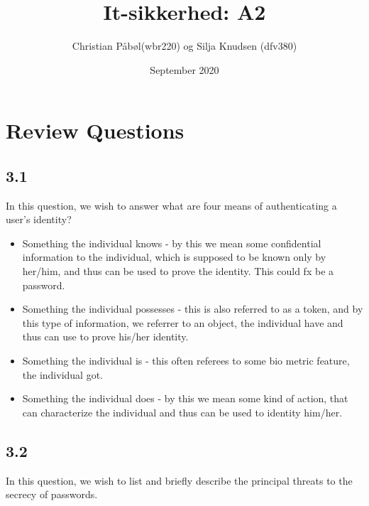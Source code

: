 \documentclass{article}
\title{It-sikkerhed: A2}
\author{Christian Påbøl(wbr220) og Silja Knudsen (dfv380) }
\date{September 2020}
\begin{document}
\maketitle

\section{Review Questions}
\subsection{3.1}
In this question, we wish to answer what are four means of authenticating a user’s identity?\\ 

\begin{itemize}
    \item Something the individual knows -  by this we mean some confidential information to the individual, which is supposed to be known only by her/him, and thus can be used to prove the identity. This could fx be a password. 
    
    \item Something the individual possesses - this is also referred to as a token, and by this type of information, we referrer to an object, the individual have and thus can use to prove his/her identity. 
    
    \item Something the individual is - this often referees to some bio metric feature, the individual got. 
    
    \item Something the individual does - by this we mean some kind of action, that can characterize the individual and thus can be used to identity him/her. 
\end{itemize}
\subsection{3.2}
In this question, we wish to list and briefly describe the principal threats to the secrecy of passwords. \\ 

\end{document}
